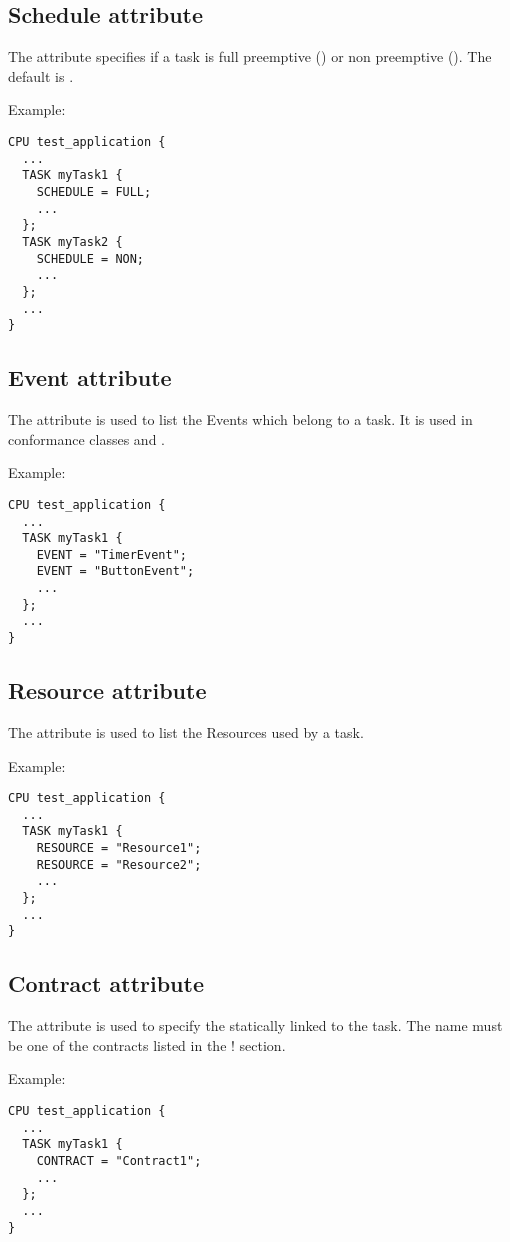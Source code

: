 \subsection{Schedule attribute}
The  attribute specifies if a task is full preemptive
() or non preemptive ().  The default is .

Example:

\begin{lstlisting}
CPU test_application {
  ...
  TASK myTask1 {
    SCHEDULE = FULL;
    ...
  };
  TASK myTask2 {
    SCHEDULE = NON;
    ...
  };
  ...
}
\end{lstlisting}

\subsection{Event attribute}
The  attribute is used to list the Events which belong to
a task. It is used in conformance classes  and
.

Example:

\begin{lstlisting}
CPU test_application {
  ...
  TASK myTask1 {
    EVENT = "TimerEvent";
    EVENT = "ButtonEvent";
    ...
  };
  ...
}
\end{lstlisting}

\subsection{Resource attribute}
The  attribute is used to list the
Resources used by a task.

Example:

\begin{lstlisting}
CPU test_application {
  ...
  TASK myTask1 {
    RESOURCE = "Resource1";
    RESOURCE = "Resource2";
    ...
  };
  ...
}
\end{lstlisting}


\subsection{Contract attribute}
The  attribute is used to specify the  statically linked to the task. The  name must be one of the contracts listed in the  ! section.

Example:

\begin{lstlisting}
CPU test_application {
  ...
  TASK myTask1 {
    CONTRACT = "Contract1";
    ...
  };
  ...
}
\end{lstlisting}

